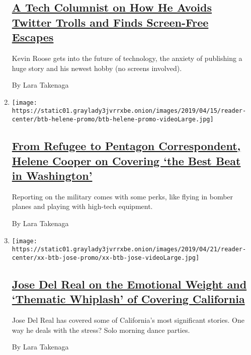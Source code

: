 \begin{enumerate}
{  \subsection{\texorpdfstring{\href{/2019/06/08/reader-center/kevin-roose-technology-the-shift.html}{A
  Tech Columnist on How He Avoids Twitter Trolls and Finds Screen-Free
  Escapes}}{A Tech Columnist on How He Avoids Twitter Trolls and Finds Screen-Free Escapes}}\label{a-tech-columnist-on-how-he-avoids-twitter-trolls-and-finds-screen-free-escapes}}

  Kevin Roose gets into the future of technology, the anxiety of
  publishing a huge story and his newest hobby (no screens involved).

  By Lara Takenaga
\item
  \texttt{[image: https://static01.graylady3jvrrxbe.onion/images/2019/04/15/reader-center/btb-helene-promo/btb-helene-promo-videoLarge.jpg]}

  \hypertarget{from-refugee-to-pentagon-correspondent-helene-cooper-on-covering-the-best-beat-in-washington}{%
  \subsection{\texorpdfstring{\href{/2019/04/12/reader-center/helene-cooper-pentagon-correspondent.html}{From
  Refugee to Pentagon Correspondent, Helene Cooper on Covering `the Best
  Beat in
  Washington'}}{From Refugee to Pentagon Correspondent, Helene Cooper on Covering `the Best Beat in Washington'}}\label{from-refugee-to-pentagon-correspondent-helene-cooper-on-covering-the-best-beat-in-washington}}

  Reporting on the military comes with some perks, like flying in bomber
  planes and playing with high-tech equipment.

  By Lara Takenaga
\item
  \texttt{[image: https://static01.graylady3jvrrxbe.onion/images/2019/04/21/reader-center/xx-btb-jose-promo/xx-btb-jose-videoLarge.jpg]}

  \hypertarget{jose-del-real-on-the-emotional-weight-and-thematic-whiplash-of-covering-california}{%
  \subsection{\texorpdfstring{\href{/2019/03/23/reader-center/jose-del-real-national-correspondent-california.html}{Jose
  Del Real on the Emotional Weight and `Thematic Whiplash' of Covering
  California}}{Jose Del Real on the Emotional Weight and `Thematic Whiplash' of Covering California}}\label{jose-del-real-on-the-emotional-weight-and-thematic-whiplash-of-covering-california}}

  Jose Del Real has covered some of California's most significant
  stories. One way he deals with the stress? Solo morning dance parties.

  By Lara Takenaga
\end{enumerate}

